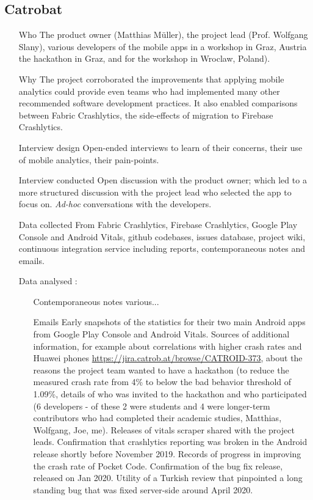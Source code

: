
\subsection{Catrobat}

\begin{itemize}
    \item[Who] The product owner (Matthias Müller), the project lead (Prof. Wolfgang Slany), various developers of the mobile apps in a workshop in Graz, Austria the hackathon in Graz, and for the workshop in Wroclaw, Poland). 
    \item[Why] The project corroborated the improvements that applying mobile analytics could provide even teams who had implemented many other recommended software development practices. It also enabled comparisons between Fabric Crashlytics, the side-effects of migration to Firebase Crashlytics. 
    \item[Interview design] Open-ended interviews to learn of their concerns, their use of mobile analytics, their pain-points.
    \item[Interview conducted] Open discussion with the product owner; which led to a more structured discussion with the project lead who selected the app to focus on. \emph{Ad-hoc} conversations with the developers.
    \item[Data collected] From Fabric Crashlytics, Firebase Crashlytics, Google Play Console and Android Vitals, github codebases, issues database, project wiki, continuous integration service including reports, contemporaneous notes and emails.
    \item[Data analysed] :
    \begin{itemize}
        \item[Contemporaneous notes] various...
        \item[Emails] Early snapshots of the statistics for their two main Android apps from Google Play Console and Android Vitals. Sources of additional information, for example about correlations with higher crash rates and Huawei phones \url{https://jira.catrob.at/browse/CATROID-373}, about the reasons the project team wanted to have a hackathon (to reduce the measured crash rate from 4\% to below the bad behavior threshold of 1.09\%, details of who was invited to the hackathon and who participated (6 developers - of these 2 were students and 4 were longer-term contributors who had completed their academic studies, Matthias, Wolfgang, Joe, me). Releases of vitals scraper shared with the project leads. Confirmation that crashlytics reporting was broken in the Android release shortly before  November 2019. Records of progress in improving the crash rate of Pocket Code. Confirmation of the bug fix release, released on  Jan 2020. Utility of a Turkish review that pinpointed a long standing bug that was fixed server-side around  April 2020.

\end{itemize}
\end{itemize}
